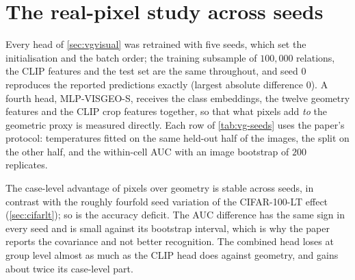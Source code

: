 \section{The real-pixel study across seeds}\label{app:vgseeds}

Every head of \cref{sec:vgvisual} was retrained with five seeds, which set the
initialisation and the batch order; the training subsample of $100{,}000$ relations, the
CLIP features and the test set are the same throughout, and seed $0$ reproduces the reported
predictions exactly (largest absolute difference $0$). A fourth head,
MLP-VISGEO-S, receives the class embeddings, the twelve geometry features and the CLIP crop
features together, so that what pixels add \emph{to} the geometric proxy is measured
directly. Each row of \cref{tab:vg-seeds} uses the paper's protocol: temperatures fitted on
the same held-out half of the images, the split on the other half, and the within-cell AUC
with an image bootstrap of $200$ replicates.

\begin{table}[h]
\centering\footnotesize
\setlength\tabcolsep{3pt}
\caption{Matched quadratic-score split and within-cell AUC for five training seeds.}
\label{tab:vg-seeds}

\end{table}

The case-level advantage of pixels over geometry is stable across seeds, in contrast with
the roughly fourfold seed variation of the CIFAR-100-LT effect (\cref{sec:cifarlt}); so is
the accuracy deficit. The AUC difference has the same sign in every seed and is small against
its bootstrap interval, which is why the paper reports the covariance and not better
recognition. The combined head loses at group level almost as much as the CLIP head does
against geometry, and gains about twice its case-level part.
